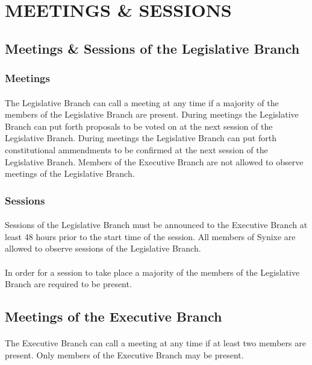 \documentclass[10pt,a4paper]{article}
\begin{document}
\section{MEETINGS \& SESSIONS}
\subsection{Meetings \& Sessions of the Legislative Branch}
\subsubsection{Meetings}
\paragraph{}
The Legislative Branch can call a meeting at any time if a majority of the members of the Legislative Branch are present. During meetings the Legislative Branch can put forth proposals to be voted on at the next session of the Legislative Branch. During meetings the Legislative Branch can put forth constitutional ammendments to be confirmed at the next session of the Legislative Branch. Members of the Executive Branch are not allowed to observe meetings of the Legislative Branch.
\subsubsection{Sessions}
\paragraph{}
Sessions of the Legislative Branch must be announced to the Executive Branch at least 48 hours prior to the start time of the session. All members of Synixe are allowed to observe sessions of the Legislative Branch.
\paragraph{}
In order for a session to take place a majority of the members of the Legislative Branch are required to be present.
\subsection{Meetings of the Executive Branch}
\paragraph{}
The Executive Branch can call a meeting at any time if at least two members are present. Only members of the Executive Branch may be present.
\end{document}
